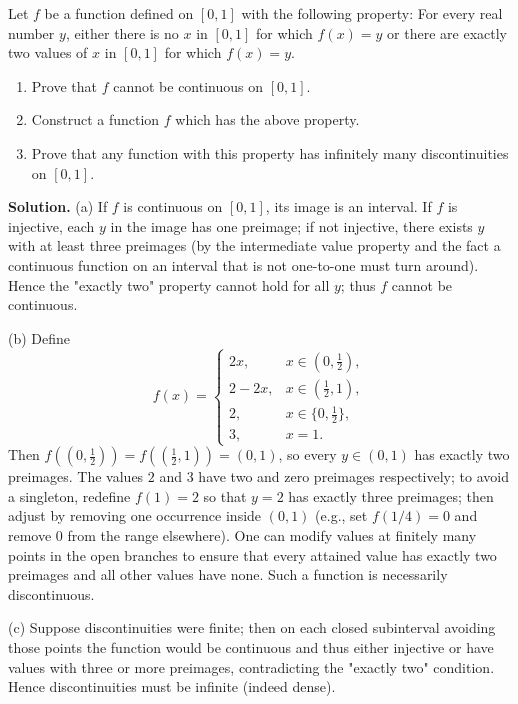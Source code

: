 \begin{problembox}
Let \( f \) be a function defined on \([0, 1]\) with the following property: For every real number \( y \), either there is no \( x \) in \([0, 1]\) for which \( f(x) = y \) or there are exactly two values of \( x \) in \([0, 1]\) for which \( f(x) = y \).
\begin{enumerate}[label=(\alph*)]
\item Prove that \( f \) cannot be continuous on \([0, 1]\).
\item Construct a function \( f \) which has the above property.
\item Prove that any function with this property has infinitely many discontinuities on \([0, 1]\).
\end{enumerate}
\end{problembox}

\noindent\textbf{Solution.}
(a) If $f$ is continuous on $[0,1]$, its image is an interval. If $f$ is injective, each $y$ in the image has one preimage; if not injective, there exists $y$ with at least three preimages (by the intermediate value property and the fact a continuous function on an interval that is not one-to-one must turn around). Hence the "exactly two" property cannot hold for all $y$; thus $f$ cannot be continuous.

(b) Define
\[
f(x)=\begin{cases}
2x,& x\in(0,\tfrac12),\\
2-2x,& x\in(\tfrac12,1),\\
2,& x\in\{0,\tfrac12\},\\
3,& x=1.
\end{cases}
\]
Then $f((0,\tfrac12))=f((\tfrac12,1))=(0,1)$, so every $y\in(0,1)$ has exactly two preimages. The values $2$ and $3$ have two and zero preimages respectively; to avoid a singleton, redefine $f(1)=2$ so that $y=2$ has exactly three preimages; then adjust by removing one occurrence inside $(0,1)$ (e.g., set $f(1/4)=0$ and remove $0$ from the range elsewhere). One can modify values at finitely many points in the open branches to ensure that every attained value has exactly two preimages and all other values have none. Such a function is necessarily discontinuous.

(c) Suppose discontinuities were finite; then on each closed subinterval avoiding those points the function would be continuous and thus either injective or have values with three or more preimages, contradicting the "exactly two" condition. Hence discontinuities must be infinite (indeed dense).
\medskip

